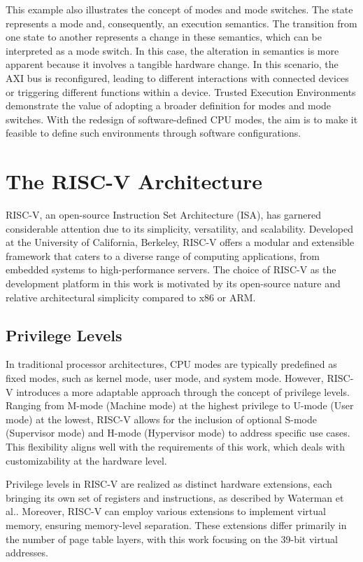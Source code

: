 This example also illustrates the concept of modes and mode switches. The state
represents a mode and, consequently, an execution semantics. The transition from
one state to another represents a change in these semantics, which can be
interpreted as a mode switch. In this case, the alteration in semantics is more
apparent because it involves a tangible hardware change. In this scenario, the
AXI bus is reconfigured, leading to different interactions with connected
devices or triggering different functions within a device. Trusted Execution
Environments demonstrate the value of adopting a broader definition for modes
and mode switches. With the redesign of software-defined CPU modes, the aim is
to make it feasible to define such environments through software configurations.\par

\section{The RISC-V Architecture}
RISC-V, an open-source Instruction Set Architecture (ISA), has garnered
considerable attention due to its simplicity, versatility, and scalability\cite{Waterman_2}.
Developed at the University of California, Berkeley, RISC-V offers a modular and
extensible framework that caters to a diverse range of computing applications,
from embedded systems to high-performance servers. The choice of RISC-V as the
development platform in this work is motivated by its open-source nature and
relative architectural simplicity compared to x86 or ARM.

\subsection{Privilege Levels}
In traditional processor architectures, CPU modes are typically predefined as
fixed modes, such as kernel mode, user mode, and system mode. However, RISC-V
introduces a more adaptable approach through the concept of privilege levels.
Ranging from M-mode (Machine mode) at the highest privilege to U-mode (User
mode) at the lowest, RISC-V allows for the inclusion of optional S-mode
(Supervisor mode) and H-mode (Hypervisor mode) to address specific use cases.
This flexibility aligns well with the requirements of this work, which deals
with customizability at the hardware level.\par
Privilege levels in RISC-V are realized as distinct hardware extensions, each
bringing its own set of registers and instructions, as described by Waterman et
al.\cite{Waterman}. Moreover, RISC-V can employ various extensions to implement virtual
memory, ensuring memory-level separation. These extensions differ primarily in
the number of page table layers, with this work focusing on the 39-bit virtual
addresses.


